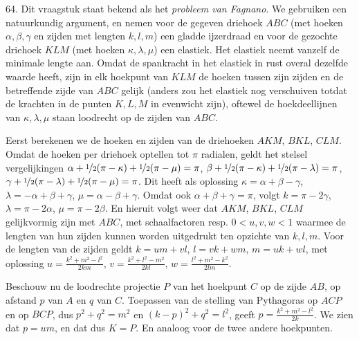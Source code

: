 \begin{problem}{64.}
    Dit vraagstuk staat bekend als het \textit{probleem van Fagnano}. We gebruiken een natuurkundig argument, en nemen voor de gegeven driehoek $ABC$ (met hoeken $\alpha,\beta,\gamma$ en zijden met lengten $k,l,m$) een gladde ijzerdraad en voor de gezochte driehoek $KLM$ (met hoeken $\kappa,\lambda,\mu$) een elastiek. Het elastiek neemt vanzelf de minimale lengte aan. Omdat de spankracht in het elastiek in rust overal dezelfde waarde heeft, zijn in elk hoekpunt van $KLM$ de hoeken tussen zijn zijden en de betreffende zijde van $ABC$ gelijk (anders zou het elastiek nog verschuiven totdat de krachten in de punten $K,L,M$ in evenwicht zijn), oftewel de hoekdeellijnen van $\kappa,\lambda,\mu$ staan loodrecht op de zijden van $ABC$.

    Eerst berekenen we de hoeken en zijden van de driehoeken $AKM$, $BKL$, $CLM$. Omdat de hoeken per driehoek optellen tot $\pi$ radialen, geldt het stelsel vergelijkingen $\alpha + \nicefrac{1}{2} (\pi - \kappa) + \nicefrac{1}{2} (\pi - \mu) = \pi$, $\beta + \nicefrac{1}{2} (\pi - \kappa) + \nicefrac{1}{2} (\pi - \lambda) = \pi$, $\gamma + \nicefrac{1}{2} (\pi - \lambda) + \nicefrac{1}{2} (\pi - \mu) = \pi$. Dit heeft als oplossing $\kappa = \alpha + \beta - \gamma$, $\lambda = -\alpha + \beta + \gamma$, $\mu = \alpha - \beta + \gamma$. Omdat ook $\alpha + \beta + \gamma = \pi$, volgt $k = \pi - 2 \gamma$, $\lambda = \pi - 2 \alpha$, $\mu = \pi - 2 \beta$. En hieruit volgt weer dat $AKM$, $BKL$, $CLM$ gelijkvormig zijn met $ABC$, met schaalfactoren resp. $0 < u,v,w < 1$ waarmee de lengten van hun zijden kunnen worden uitgedrukt ten opzichte van $k,l,m$. Voor de lengten van de zijden geldt $k = u m + v l$, $l = v k + w m$, $m = u k + w l$, met oplossing $u = \frac{k^2 + m^2 - l^2}{2 k m}$, $v = \frac{k^2 + l^2 - m^2}{2 k l}$, $w = \frac{l^2 + m^2 - k^2}{2 l m}$.

    Beschouw nu de loodrechte projectie $P$ van het hoekpunt $C$ op de zijde $AB$, op afstand $p$ van $A$ en $q$ van $C$. Toepassen van de stelling van Pythagoras op $ACP$ en op $BCP$, dus $p^2 + q^2 = m^2$ en $(k - p)^2 + q^2 = l^2$, geeft $p = \frac{k^2 + m^2 - l^2}{2 k}$. We zien dat $p = u m$, en dat dus $K = P$. En analoog voor de twee andere hoekpunten.


\end{problem}
